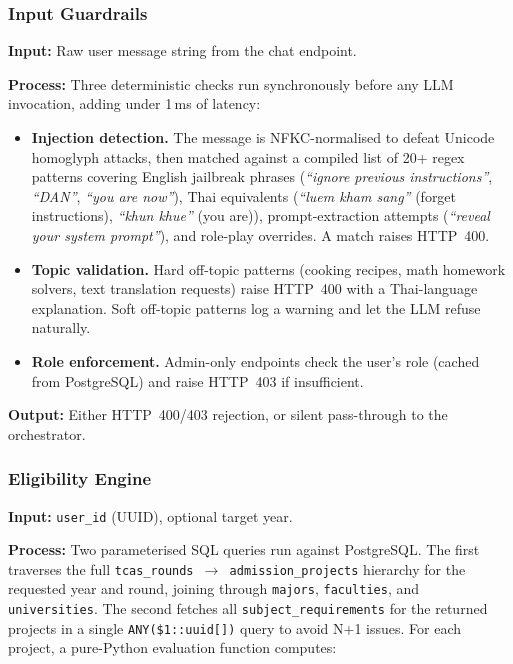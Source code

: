 ﻿\documentclass[12pt,a4paper]{article}
\begin{document}
\subsubsection{Input Guardrails}

\textbf{Input:} Raw user message string from the chat endpoint.

\textbf{Process:} Three deterministic checks run synchronously before any LLM
invocation, adding under 1\,ms of latency:

\begin{itemize}[leftmargin=2em]
    \item \textbf{Injection detection.} The message is NFKC-normalised to defeat
    Unicode homoglyph attacks, then matched against a compiled list of 20+
    regex patterns covering English jailbreak phrases (\emph{``ignore previous
    instructions''}, \emph{``DAN''}, \emph{``you are now''}), Thai equivalents
    (\emph{``luem kham sang''} (forget instructions), \emph{``khun khue''} (you are)), prompt-extraction attempts
    (\emph{``reveal your system prompt''}), and role-play overrides. A match raises
    HTTP~400.
    \item \textbf{Topic validation.} Hard off-topic patterns (cooking recipes, math
    homework solvers, text translation requests) raise HTTP~400 with a
    Thai-language explanation. Soft off-topic patterns log a warning and let the
    LLM refuse naturally.
    \item \textbf{Role enforcement.} Admin-only endpoints check the user's role
    (cached from PostgreSQL) and raise HTTP~403 if insufficient.
\end{itemize}

\textbf{Output:} Either HTTP~400/403 rejection, or silent pass-through to the
orchestrator.

\subsubsection{Eligibility Engine}

\textbf{Input:} \texttt{user\_id} (UUID), optional target year.

\textbf{Process:} Two parameterised SQL queries run against PostgreSQL. The first
traverses the full \texttt{tcas\_rounds~$\to$~admission\_projects} hierarchy for the
requested year and round, joining through \texttt{majors}, \texttt{faculties}, and
\texttt{universities}. The second fetches all \texttt{subject\_requirements} for the
returned projects in a single \texttt{ANY(\$1::uuid[])} query to avoid N+1 issues.
For each project, a pure-Python evaluation function computes:
\end{document}

